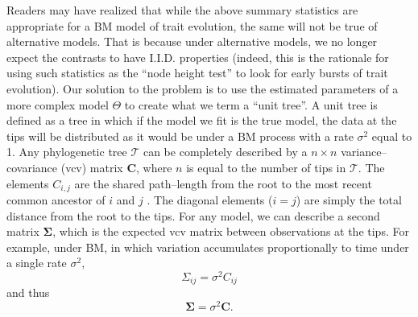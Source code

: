 \documentclass[a4paper,12pt]{article}
\begin{document}
Readers may have realized that while the above summary statistics are appropriate for a BM model of trait evolution, the same will not be true of alternative models. That is because under alternative models, we no longer expect the contrasts to have I.I.D. properties (indeed, this is the rationale for using such statistics as the ``node height test'' \citep{FreckletonHarvey2006} to look for early bursts of trait evolution). Our solution to the problem is to use the estimated parameters of a more complex model $\Theta$ to create what we term a ``unit tree''. A unit tree is defined as a tree in which if the model we fit is the true model, the data at the tips will be distributed as it would be under a BM process with a rate $\sigma^2$ equal to 1. Any phylogenetic tree $\mathcal{T}$ can be completely described by a $n \times n$ variance--covariance (vcv) matrix $\mathbf{C}$, where $n$ is equal to the number of tips in $\mathcal{T}$. The elements $C_{i,j}$ are the shared path--length from the root to the most recent common ancestor of $i$ and $j$ \citep{Piazza1975}. The diagonal elements ($i = j$) are simply the total distance from the root to the tips. For any model, we can describe a second matrix $\mathbf{\Sigma}$, which is the expected vcv matrix between observations at the tips. For example, under BM, in which variation accumulates proportionally to time under a single rate $\sigma^2$,
\begin{equation}
\Sigma_{ij} = \sigma^2 C_{ij}
\end{equation}
and thus
\begin{equation}
\mathbf{\Sigma} = \sigma^2 \mathbf{C}.
\end{equation}
\end{document}
